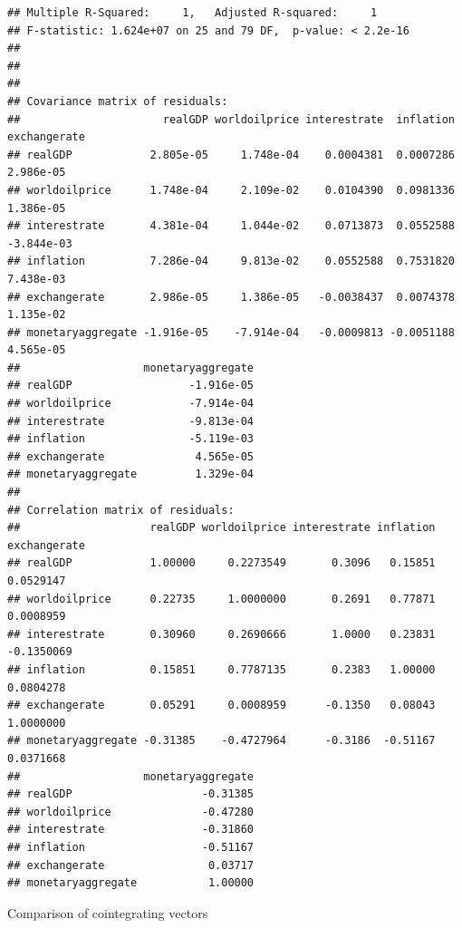 \documentclass[11pt,preprint, authoryear]{elsarticle}
\numberwithin{equation}{section}
\numberwithin{figure}{section}
\numberwithin{table}{section}
\begin{document}
\begin{verbatim}
## Multiple R-Squared:     1,   Adjusted R-squared:     1 
## F-statistic: 1.624e+07 on 25 and 79 DF,  p-value: < 2.2e-16 
## 
## 
## 
## Covariance matrix of residuals:
##                      realGDP worldoilprice interestrate  inflation exchangerate
## realGDP            2.805e-05     1.748e-04    0.0004381  0.0007286    2.986e-05
## worldoilprice      1.748e-04     2.109e-02    0.0104390  0.0981336    1.386e-05
## interestrate       4.381e-04     1.044e-02    0.0713873  0.0552588   -3.844e-03
## inflation          7.286e-04     9.813e-02    0.0552588  0.7531820    7.438e-03
## exchangerate       2.986e-05     1.386e-05   -0.0038437  0.0074378    1.135e-02
## monetaryaggregate -1.916e-05    -7.914e-04   -0.0009813 -0.0051188    4.565e-05
##                   monetaryaggregate
## realGDP                  -1.916e-05
## worldoilprice            -7.914e-04
## interestrate             -9.813e-04
## inflation                -5.119e-03
## exchangerate              4.565e-05
## monetaryaggregate         1.329e-04
## 
## Correlation matrix of residuals:
##                    realGDP worldoilprice interestrate inflation exchangerate
## realGDP            1.00000     0.2273549       0.3096   0.15851    0.0529147
## worldoilprice      0.22735     1.0000000       0.2691   0.77871    0.0008959
## interestrate       0.30960     0.2690666       1.0000   0.23831   -0.1350069
## inflation          0.15851     0.7787135       0.2383   1.00000    0.0804278
## exchangerate       0.05291     0.0008959      -0.1350   0.08043    1.0000000
## monetaryaggregate -0.31385    -0.4727964      -0.3186  -0.51167    0.0371668
##                   monetaryaggregate
## realGDP                    -0.31385
## worldoilprice              -0.47280
## interestrate               -0.31860
## inflation                  -0.51167
## exchangerate                0.03717
## monetaryaggregate           1.00000
\end{verbatim}

Comparison of cointegrating vectors
\end{document}

